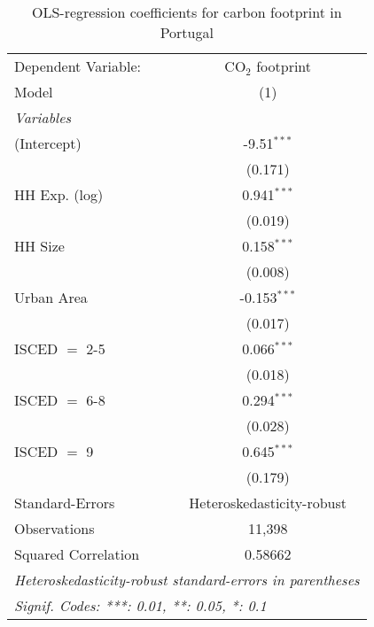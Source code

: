 
\begin{table}[htbp!]
   \centering
   \small
   \begin{adjustbox}{width = 1\textwidth, max height = 0.95\textheight, center}
      \begin{threeparttable}[b]
         \caption{\label{tab:OLS_2_PRT} OLS-regression coefficients for carbon footprint in Portugal}
         \begin{tabular}{lc}
            \tabularnewline \midrule \midrule
            Dependent Variable: & CO$_{2}$ footprint\\  
            Model               & (1)\\  
            \midrule
            \emph{Variables}\\
            (Intercept)         & -9.51$^{***}$\\   
                                & (0.171)\\   
            HH Exp. (log)       & 0.941$^{***}$\\   
                                & (0.019)\\   
            HH Size             & 0.158$^{***}$\\   
                                & (0.008)\\   
            Urban Area          & -0.153$^{***}$\\   
                                & (0.017)\\   
            ISCED $=$ 2-5       & 0.066$^{***}$\\   
                                & (0.018)\\   
            ISCED $=$ 6-8       & 0.294$^{***}$\\   
                                & (0.028)\\   
            ISCED $=$ 9         & 0.645$^{***}$\\   
                                & (0.179)\\   
            \midrule 
            Standard-Errors     & Heteroskedasticity-robust \\   
            Observations        & 11,398\\  
            Squared Correlation & 0.58662\\  
            \midrule \midrule
            \multicolumn{2}{l}{\emph{Heteroskedasticity-robust standard-errors in parentheses}}\\
            \multicolumn{2}{l}{\emph{Signif. Codes: ***: 0.01, **: 0.05, *: 0.1}}\\
         \end{tabular}
         

\end{threeparttable}
\end{adjustbox}
\end{table}
